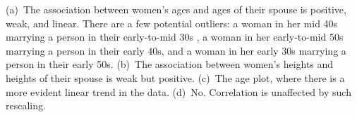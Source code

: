 (a)~The association between women's ages and ages of their spouse is positive, 
weak, and linear. There are a few potential outliers: a woman in her mid 40s marrying a person in their early-to-mid 30s , a woman in her early-to-mid 50s marrying a person in their early 40s, and a woman in her early 30s marrying a person in their early 50s.
(b)~The association between women's heights and heights of their spouse is weak but 
positive.
(c)~The age plot, where there is a more evident linear trend in the 
data.
(d)~No. Correlation is unaffected by such rescaling.
